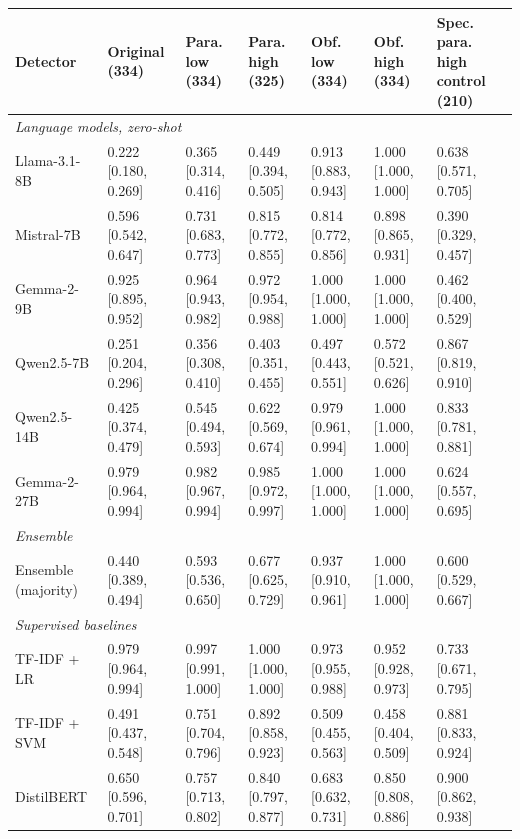 \begin{tabular}{lllllll}
\toprule
Detector & Original (334) & Para. low (334) & Para. high (325) & Obf. low (334) & Obf. high (334) & Spec. para. high control (210) \\
\midrule
\multicolumn{7}{l}{\textit{Language models, zero-shot}} \\
Llama-3.1-8B & 0.222 [0.180, 0.269] & 0.365 [0.314, 0.416] & 0.449 [0.394, 0.505] & 0.913 [0.883, 0.943] & 1.000 [1.000, 1.000] & 0.638 [0.571, 0.705] \\
Mistral-7B & 0.596 [0.542, 0.647] & 0.731 [0.683, 0.773] & 0.815 [0.772, 0.855] & 0.814 [0.772, 0.856] & 0.898 [0.865, 0.931] & 0.390 [0.329, 0.457] \\
Gemma-2-9B & 0.925 [0.895, 0.952] & 0.964 [0.943, 0.982] & 0.972 [0.954, 0.988] & 1.000 [1.000, 1.000] & 1.000 [1.000, 1.000] & 0.462 [0.400, 0.529] \\
Qwen2.5-7B & 0.251 [0.204, 0.296] & 0.356 [0.308, 0.410] & 0.403 [0.351, 0.455] & 0.497 [0.443, 0.551] & 0.572 [0.521, 0.626] & 0.867 [0.819, 0.910] \\
Qwen2.5-14B & 0.425 [0.374, 0.479] & 0.545 [0.494, 0.593] & 0.622 [0.569, 0.674] & 0.979 [0.961, 0.994] & 1.000 [1.000, 1.000] & 0.833 [0.781, 0.881] \\
Gemma-2-27B & 0.979 [0.964, 0.994] & 0.982 [0.967, 0.994] & 0.985 [0.972, 0.997] & 1.000 [1.000, 1.000] & 1.000 [1.000, 1.000] & 0.624 [0.557, 0.695] \\
\midrule
\multicolumn{7}{l}{\textit{Ensemble}} \\
Ensemble (majority) & 0.440 [0.389, 0.494] & 0.593 [0.536, 0.650] & 0.677 [0.625, 0.729] & 0.937 [0.910, 0.961] & 1.000 [1.000, 1.000] & 0.600 [0.529, 0.667] \\
\midrule
\multicolumn{7}{l}{\textit{Supervised baselines}} \\
TF-IDF + LR & 0.979 [0.964, 0.994] & 0.997 [0.991, 1.000] & 1.000 [1.000, 1.000] & 0.973 [0.955, 0.988] & 0.952 [0.928, 0.973] & 0.733 [0.671, 0.795] \\
TF-IDF + SVM & 0.491 [0.437, 0.548] & 0.751 [0.704, 0.796] & 0.892 [0.858, 0.923] & 0.509 [0.455, 0.563] & 0.458 [0.404, 0.509] & 0.881 [0.833, 0.924] \\
DistilBERT & 0.650 [0.596, 0.701] & 0.757 [0.713, 0.802] & 0.840 [0.797, 0.877] & 0.683 [0.632, 0.731] & 0.850 [0.808, 0.886] & 0.900 [0.862, 0.938] \\
\bottomrule
\end{tabular}
